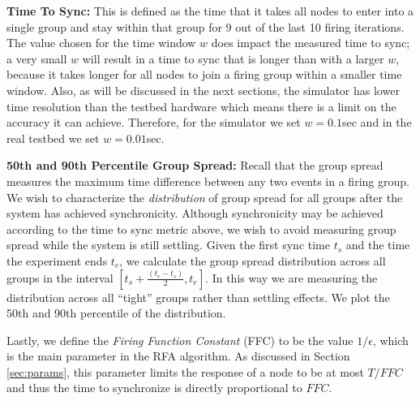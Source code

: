 \begin{description}
\item {\bf Time To Sync:} This is defined as the time that it takes
all nodes to enter into a single group and stay within that group for
9 out of the last 10 firing iterations. The value chosen for the time
window $w$ does impact the measured time to sync; a very small $w$
will result in a time to sync that is longer than with a larger $w$,
because it takes longer for all nodes to join a firing group within a
smaller time window. Also, as will be discussed in the next sections,
the simulator has lower time resolution than the testbed hardware
which means there is a limit on the accuracy it can
achieve. Therefore, for the simulator we set $w = 0.1$sec and in the
real testbed we set $w = 0.01$sec.

\item{\bf 50th and 90th Percentile Group Spread:} Recall that the
group spread measures the maximum time difference between any two
events in a firing group. We wish to characterize the {\em
distribution} of group spread for all groups after the system has
achieved synchronicity. Although synchronicity may be achieved
according to the time to sync metric above, we wish to avoid measuring
group spread while the system is still settling. Given the first sync
time $t_s$ and the time the experiment ends $t_e$, we calculate the
group spread distribution across all groups in the interval $[t_s +
\frac{(t_e - t_s)}{2}, t_e]$. In this way we are measuring the
distribution across all ``tight'' groups rather than settling
effects. We plot the 50th and 90th percentile of the distribution.

\end{description}


Lastly, we define the {\em Firing Function Constant} (FFC) to be the
value $1/\epsilon$, which is the main parameter in the RFA
algorithm. As discussed in Section \ref{sec:params}, this parameter
limits the response of a node to be at most $T/FFC$ and
thus the time to synchronize is directly proportional to
$FFC$. 
